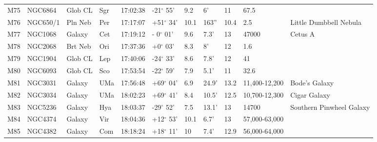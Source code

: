 \begin{longtable}{@{}lllllllllll@{}}
M75        & NGC6864     & Glob CL    & Sgr       & 17:02:38 & -21$^{\circ}$ 55'  & 9.2       & 6'                   & 11       & 67.5                &                                           \\
M76        & NGC650/1    & Pln Neb    & Per       & 17:17:07 & +51$^{\circ}$ 34'  & 10.1      & 163''                & 10.4     & 2.5                 & Little Dumbbell Nebula                    \\
M77        & NGC1068     & Galaxy     & Cet       & 17:19:12 & - 0$^{\circ}$ 01'  & 9.6       & 7.3'                 & 13       & 47000               & Cetus A                                   \\
M78        & NGC2068     & Brt Neb    & Ori       & 17:37:36 & +0$^{\circ}$ 03'   & 8.3       & 8'                   & 12       & 1.6                 &                                           \\
M79        & NGC1904     & Glob CL    & Lep       & 17:40:06 & -24$^{\circ}$ 33'  & 8.6       & 7.8'                 & 12       & 41                  &                                           \\
M80        & NGC6093     & Glob CL    & Sco       & 17:53:54 & -22$^{\circ}$ 59'  & 7.9       & 5.1'                 & 11       & 32.6                &                                           \\
M81        & NGC3031     & Galaxy     & UMa       & 17:56:48 & +69$^{\circ}$ 04'  & 6.9       & 24.9'                & 13.2     & 11,400-12,200       & Bode's Galaxy                             \\
M82        & NGC3034     & Galaxy     & UMa       & 18:02:23 & +69$^{\circ}$ 41'  & 8.4       & 10.5'                & 12.5     & 10,700-12,300       & Cigar Galaxy                              \\
M83        & NGC5236     & Galaxy     & Hya       & 18:03:37 & -29$^{\circ}$ 52'  & 7.5       & 13.1'                & 13       & 14700               & Southern Pinwheel Galaxy                  \\
M84        & NGC4374     & Galaxy     & Vir       & 18:04:36 & +12$^{\circ}$ 53'  & 10.1      & 6.7'                 & 13       & 57,000-63,000       &                                           \\
M85        & NGC4382     & Galaxy     & Com       & 18:18:24 & +18$^{\circ}$ 11'  & 10        & 7.4'                 & 12.9     & 56,000-64,000       &                                           \\

\end{longtable}
